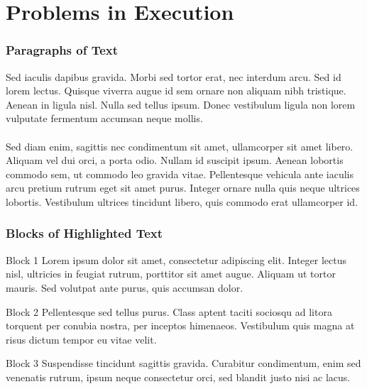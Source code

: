 \documentclass{beamer}
\begin{document}
\section{Problems in Execution}


\begin{frame}
	\frametitle{Paragraphs of Text}
	Sed iaculis dapibus gravida. Morbi sed tortor erat, nec interdum arcu. Sed id lorem lectus. Quisque viverra augue id sem ornare non aliquam nibh tristique. Aenean in ligula nisl. Nulla sed tellus ipsum. Donec vestibulum ligula non lorem vulputate fermentum accumsan neque mollis.\\~\\
	
	Sed diam enim, sagittis nec condimentum sit amet, ullamcorper sit amet libero. Aliquam vel dui orci, a porta odio. Nullam id suscipit ipsum. Aenean lobortis commodo sem, ut commodo leo gravida vitae. Pellentesque vehicula ante iaculis arcu pretium rutrum eget sit amet purus. Integer ornare nulla quis neque ultrices lobortis. Vestibulum ultrices tincidunt libero, quis commodo erat ullamcorper id.
\end{frame}




\begin{frame}
	\frametitle{Blocks of Highlighted Text}
	\begin{block}{Block 1}
		Lorem ipsum dolor sit amet, consectetur adipiscing elit. Integer lectus nisl, ultricies in feugiat rutrum, porttitor sit amet augue. Aliquam ut tortor mauris. Sed volutpat ante purus, quis accumsan dolor.
	\end{block}
	
	\begin{block}{Block 2}
		Pellentesque sed tellus purus. Class aptent taciti sociosqu ad litora torquent per conubia nostra, per inceptos himenaeos. Vestibulum quis magna at risus dictum tempor eu vitae velit.
	\end{block}
	
	\begin{block}{Block 3}
		Suspendisse tincidunt sagittis gravida. Curabitur condimentum, enim sed venenatis rutrum, ipsum neque consectetur orci, sed blandit justo nisi ac lacus.
	\end{block}
\end{frame}

\end{document}
